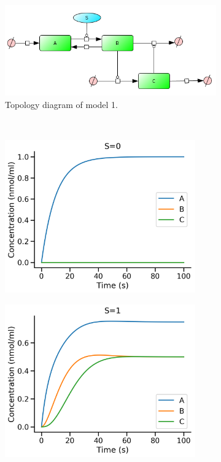 \documentclass[11pt]{article}
\begin{document}
    \begin{figure}[h]
        \begin{subfigure}{0.7\textwidth}
            \centering
            \includegraphics[width=\textwidth]{./figures/model1}
            \caption{Topology diagram of model 1.}
            \label{fig:model1:network}
        \end{subfigure}\\
        \centering
        \begin{subfigure}{0.45\textwidth}
            \centering
            \includegraphics[width=0.9\textwidth]{./figures/WithoutS.png}
            \caption{}
            \label{a}
        \end{subfigure}
        \begin{subfigure}{0.45\textwidth}
            \centering
            \includegraphics[width=0.9\textwidth]{./figures/WithS.png}

\end{subfigure}
\end{figure}
\end{document}

